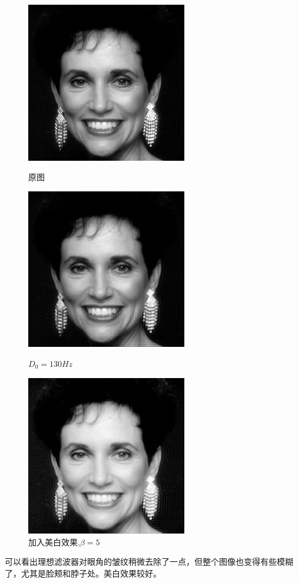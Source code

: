 \documentclass[11pt, a4paper, UTF8]{ctexart}
\begin{document}
    
    \begin{figure}[H]
      \centering
      \begin{minipage}[t]{0.48\textwidth}
      \centering
      \includegraphics[width=7cm]{woman.png}
      \caption{原图}
      \end{minipage}
      \begin{minipage}[t]{0.48\textwidth}
      \centering
      \includegraphics[width=7cm]{Ideal_130Hz.jpg}
      \caption{$D_0 =130Hz$}
      \end{minipage}
      \begin{minipage}[t]{0.48\textwidth}
        \centering
        \includegraphics[width=7cm]{Ideal_log.jpg}
        \caption{加入美白效果,$\beta=5$}
        \end{minipage}
    \end{figure}
    可以看出理想滤波器对眼角的皱纹稍微去除了一点，但整个图像也变得有些模糊了，尤其是脸颊和脖子处。美白效果较好。
\end{document}
